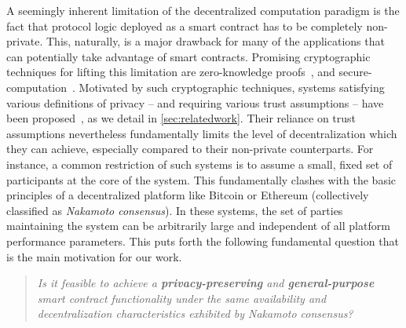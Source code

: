 A seemingly inherent limitation of the decentralized computation paradigm is the 
fact that protocol logic deployed as a smart contract has to be completely
non-private. This, naturally, is a major drawback for many
of the applications that can potentially take advantage of smart contracts. 
Promising cryptographic techniques for lifting this limitation
are zero-knowledge proofs~\cite{STOC:GolMicRac85}, and
secure-computation~\cite{STOC:GolMicWig87,Canetti02universallycomposable}.
Motivated by such cryptographic techniques, 
systems satisfying various definitions of privacy -- and requiring
various trust assumptions -- have been
proposed~\cite{zexe,SP:KMSWP16,enigmapaper,USENIX:KGCWF18}, as we detail in
\autoref{sec:relatedwork}. Their reliance on 
trust assumptions nevertheless fundamentally 
limits the level of decentralization which they can achieve, especially
  compared to their non-private
counterparts. 
For instance, a common restriction of such systems is to
assume a small, fixed set of participants at the core of the system.
This fundamentally clashes with the basic principles of a decentralized platform
like Bitcoin or Ethereum (collectively classified as {\em Nakamoto
  consensus}). In these systems, the set of parties maintaining the system 
can be arbitrarily large and independent of all platform performance parameters. 
This puts forth the following fundamental question that is the main motivation for our work. 

\begin{quote}\itshape
Is it feasible to achieve a \textbf{privacy-preserving} and \textbf{general-purpose}  
smart contract functionality under the same availability and decentralization 
characteristics exhibited by Nakamoto consensus? 
\end{quote}

